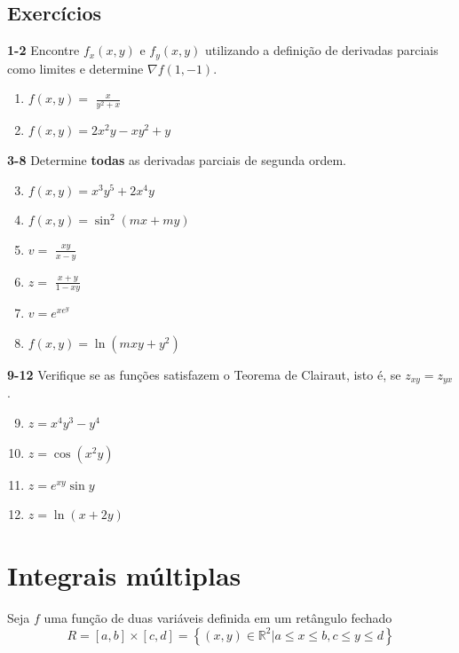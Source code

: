 \documentclass[a4paper, 12pt]{extreport}
\begin{document}
      \section{Exercícios}
      {\color{astral}\textbf{1-2}} Encontre $f_x(x,y)$ e $f_y(x,y)$ utilizando a definição de derivadas parciais como limites e \hspace*{5mm} determine $\nabla f(1,-1)$.
        \begin{multicols}{2}
          \begin{enumerate}
            \item $f(x,y) =$ {\large$\frac{x}{y^2+x}$}
            \item $f(x,y) = 2x^2y - xy^2 + y$
          \end{enumerate}
        \end{multicols}
        {\color{astral}\textbf{3-8}} Determine \textbf{todas} as derivadas parciais de segunda ordem.
        \begin{multicols}{2}
          \begin{enumerate}
            \setcounter{enumi}{2}
            \item $f(x,y) = x^3y^5 + 2x^4y$
            \item $f(x,y) = \sin^2{(mx + my)}$
            \item $v =$ {\large$\frac{xy}{x-y}$}
            \item $z =$ {\large$\frac{x+y}{1-xy}$}
            \item $v = e^{xe^y}$
            \item $f(x,y) = \ln{(mxy+y^2)}$
          \end{enumerate}
        \end{multicols}
        {\color{astral}\textbf{9-12}} Verifique se as funções satisfazem o Teorema de Clairaut, isto é, se $z_{xy} = z_{yx}$.
        \begin{multicols}{2}
          \begin{enumerate}
            \setcounter{enumi}{8}
            \item $z = x^4y^3 - y^4$
            \item $z = \cos{(x^2y)}$
            \item $z = e^{xy}\sin{y}$
            \item $z = \ln{(x+2y)}$
          \end{enumerate}
        \end{multicols}


  \chapter{Integrais múltiplas}
    Seja $f$ uma função de duas variáveis definida em um retângulo fechado
    $$ R = [a,b] \times [c,d] = \left\{(x,y) \in \mathbb{R}^2 | a \leqslant x \leqslant b, c \leqslant y \leqslant d \right\} $$
\end{document}
